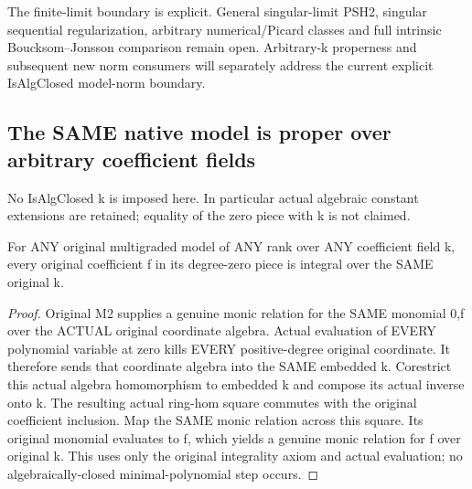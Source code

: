 The finite-limit boundary is explicit. General singular-limit PSH2,
singular sequential regularization, arbitrary numerical/Picard classes
and full intrinsic Boucksom--Jonsson comparison remain open. Arbitrary-k
properness and subsequent new norm consumers will separately address the
current explicit IsAlgClosed model-norm boundary.

\subsection{The SAME native model is proper over arbitrary coefficient fields}
No IsAlgClosed k is imposed here. In particular actual algebraic constant
extensions are retained; equality of the zero piece with k is not claimed.

\begin{theorem}
\label{thm:seven-original-degree-zero-integral-arbitrary-field}
\leanok
For ANY original multigraded model of ANY rank over ANY coefficient
field k, every original coefficient f in its degree-zero piece is
integral over the SAME original k.
\end{theorem}
\begin{proof}
Original M2 supplies a genuine monic relation for the SAME monomial
0,f over the ACTUAL original coordinate algebra. Actual evaluation of
EVERY polynomial variable at zero kills EVERY positive-degree original
coordinate. It therefore sends that coordinate algebra into the SAME
embedded k. Corestrict this actual algebra homomorphism to embedded k
and compose its actual inverse onto k. The resulting actual ring-hom
square commutes with the original coefficient inclusion. Map the SAME
monic relation across this square. Its original monomial evaluates to
f, which yields a genuine monic relation for f over original k. This
uses only the original integrality axiom and actual evaluation; no
algebraically-closed minimal-polynomial step occurs.
\end{proof}

